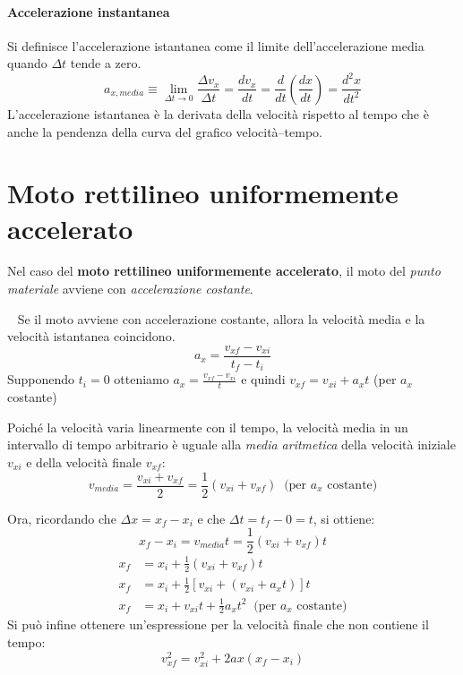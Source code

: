\documentclass[12pt,oneside]{book}
\begin{document}
\paragraph{Accelerazione instantanea} Si definisce l'accelerazione istantanea come il limite dell'accelerazione
media quando $\Delta t$ tende a zero.
\begin{equation*}
    a_{x,media} \equiv \lim_{\Delta t \to 0} \frac{\Delta v_x}{\Delta t} = \frac{dv_x}{dt} = \frac{d}{dt} (\frac{dx}{dt}) = \frac{d^2x}{dt^2}
\end{equation*}
L’accelerazione istantanea è la derivata della velocità rispetto al tempo che è anche la pendenza della curva del grafico velocità–tempo.

\section{Moto rettilineo uniformemente accelerato}
Nel caso del \textbf{moto rettilineo uniformemente accelerato}, il moto del \emph{punto materiale} avviene con \emph{accelerazione costante}.

~\newline
\noindent Se il moto avviene con accelerazione costante, allora la velocità media e la velocità istantanea coincidono.
\begin{equation*}
    a_x = \frac{v_{xf}-v_{xi}}{t_f-t_i}
\end{equation*}
Supponendo $t_i = 0$ otteniamo $a_x = \frac{v_{xf}-v_{xi}}{t}$ e quindi $v_{xf} = v_{xi} + a_x t$ (per $a_x$ costante)

Poiché la velocità varia linearmente con il tempo, la velocità media in un intervallo di tempo
arbitrario è uguale alla \emph{media aritmetica} della velocità iniziale $v_{xi}$ e della velocità finale $v_{xf}$:
\begin{equation*}
    v_{media} = \frac{v_{xi} + v_{xf}}{2} = \frac{1}{2} (v_{xi} + v_{xf}) \; \; \text{(per } a_{x} \text{ costante)}
\end{equation*}

Ora, ricordando che $\Delta x = x_f - x_i$ e che $\Delta t = t_f - 0 = t$, si ottiene:
\begin{equation*}
    x_f - x_i = v_{media} t = \frac{1}{2} (v_{xi} + v_{xf}) t
\end{equation*}
\begin{align*}
    x_f & = x_i + \frac{1}{2} (v_{xi} + v_{xf}) t                                         \\
    x_f & = x_i + \frac{1}{2} [v_{xi} + (v_{xi} + a_x t)] t                               \\
    x_f & = x_i + v_{xi} t + \frac{1}{2} a_x t^2 \; \; \text{(per } a_x \text{ costante)}
\end{align*}
Si può infine ottenere un’espressione per la velocità finale che non contiene il tempo:
\begin{equation*}
    v_{xf}^2 = v_{xi}^2 + 2ax(x_f - x_i)
\end{equation*}
\end{document}
